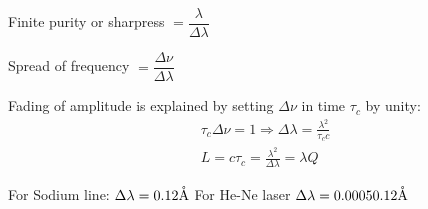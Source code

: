 Finite purity or sharpress $=\dfrac{\lambda}{\Delta \lambda}$

Spread of frequency $= \dfrac{\Delta \nu}{\Delta\lambda}$

\vspace{.4cm}

Fading of amplitude is explained by setting $\Delta\nu$ in time $\tau_c$ by unity:
$$
	\begin{aligned}
		 & \tau_c \Delta \nu=1 \Rightarrow \Delta \lambda=\frac{\lambda^2}{\tau_c c} \\
		 & L=c \tau_c=\frac{\lambda^2}{\Delta \lambda}= \lambda Q
	\end{aligned}
$$

For Sodium line: $\Delta \lambda = 0.12\mathring{\textrm{A}}$
For He-Ne laser $\Delta \lambda = 0.0005 0.12\mathring{\textrm{A}}$

